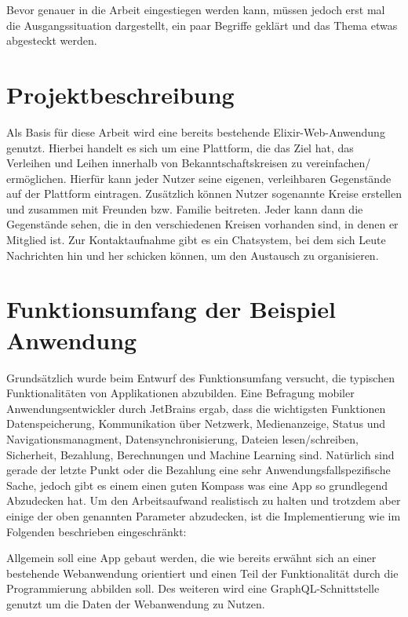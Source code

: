 Bevor genauer in die Arbeit eingestiegen werden kann, müssen jedoch erst mal die Ausgangssituation dargestellt, ein paar Begriffe geklärt und das Thema etwas abgesteckt werden.

\section{Projektbeschreibung}
Als Basis für diese Arbeit wird eine bereits bestehende Elixir-Web-Anwendung genutzt. Hierbei handelt  es sich um eine Plattform, die das Ziel hat, das Verleihen und Leihen innerhalb von Bekanntschaftskreisen zu vereinfachen/ ermöglichen. Hierfür kann jeder Nutzer seine eigenen, verleihbaren Gegenstände auf der Plattform eintragen. Zusätzlich können Nutzer sogenannte Kreise erstellen und zusammen mit Freunden bzw. Familie beitreten. Jeder kann dann die Gegenstände sehen, die in den verschiedenen Kreisen vorhanden sind, in denen er Mitglied ist. Zur Kontaktaufnahme gibt es ein Chatsystem, bei dem sich Leute Nachrichten hin und her schicken können, um den Austausch zu organisieren.

\section{Funktionsumfang der Beispiel Anwendung}
Grundsätzlich wurde beim Entwurf des Funktionsumfang versucht, die typischen Funktionalitäten von Applikationen abzubilden. Eine Befragung mobiler Anwendungsentwickler durch JetBrains ergab, dass die wichtigsten Funktionen Datenspeicherung, Kommunikation über Netzwerk, Medienanzeige, Status und Navigationsmanagment, Datensynchronisierung, Dateien lesen/schreiben, Sicherheit, Bezahlung, Berechnungen und Machine Learning sind\cite{JetBrains_miscellaneous_2021}. Natürlich sind gerade der letzte Punkt oder die Bezahlung eine sehr Anwendungsfallspezifische Sache, jedoch gibt es einem einen guten Kompass was eine App so grundlegend Abzudecken hat.
Um den Arbeitsaufwand realistisch zu halten und trotzdem aber einige der oben genannten Parameter abzudecken, ist die Implementierung wie im Folgenden beschrieben eingeschränkt:

Allgemein soll eine App gebaut werden, die wie bereits erwähnt sich an einer bestehende Webanwendung orientiert und einen Teil der Funktionalität durch die Programmierung abbilden soll. Des weiteren wird eine GraphQL-Schnittstelle genutzt um die Daten der Webanwendung zu Nutzen. 

